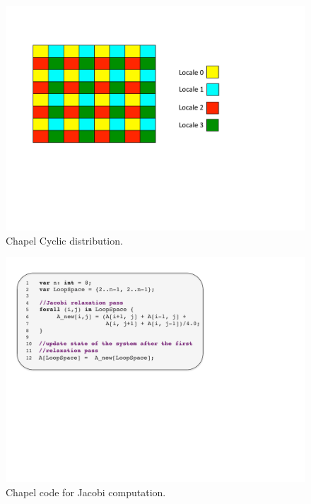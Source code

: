 \begin{figure}
	\begin{center}
	\includegraphics[scale=0.50]{./Figures/cyc_dist}
	\caption{Chapel Cyclic distribution.}
	\label{cyc_dist}
	\end{center}
\end{figure}

\begin{figure}
	\begin{center}
	\includegraphics[scale=0.50]{./Figures/jacobi}
	\caption{Chapel code for Jacobi computation.}
	\label{jacobi_code}
	\end{center}
\end{figure}